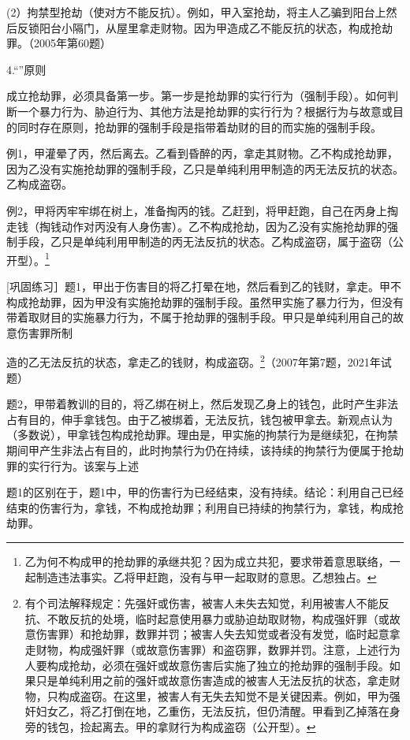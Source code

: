 (2）拘禁型抢劫（使对方不能反抗）。例如，甲入室抢劫，将主人乙骗到阳台上然后反锁阳台小隔门，从屋里拿走财物。因为甲造成乙不能反抗的状态，构成抢劫罪。（2005年第60题）

4.“”原则

成立抢劫罪，必须具备第一步。第一步是抢劫罪的实行行为（强制手段）。如何判断一个暴力行为、胁迫行为、其他方法是抢劫罪的实行行为？根据行为与故意或目的同时存在原则，抢劫罪的强制手段是指带着劫财的目的而实施的强制手段。

例1，甲灌晕了丙，然后离去。乙看到昏醉的丙，拿走其财物。乙不构成抢劫罪，因为乙没有实施抢劫罪的强制手段，乙只是单纯利用甲制造的丙无法反抗的状态。乙构成盗窃。

例2，甲将丙牢牢绑在树上，准备掏丙的钱。乙赶到，将甲赶跑，自己在丙身上掏走钱（掏钱动作对丙没有人身伤害）。乙不构成抢劫，因为乙没有实施抢劫罪的强制手段，乙只是单纯利用甲制造的丙无法反抗的状态。乙构成盗窃，属于盗窃（公开型）。\footnote{乙为何不构成甲的抢劫罪的承继共犯？因为成立共犯，要求带着意思联络，一起制造违法事实。乙将甲赶跑，没有与甲一起取财的意思。乙想独占。}

[巩固练习］题1，甲出于伤害目的将乙打晕在地，然后看到乙的钱财，拿走。甲不构成抢劫罪，因为甲没有实施抢劫罪的强制手段。虽然甲实施了暴力行为，但没有带着取财目的实施暴力行为，不属于抢劫罪的强制手段。甲只是单纯利用自己的故意伤害罪所制

造的乙无法反抗的状态，拿走乙的钱财，构成盗窃。\footnote{有个司法解释规定：先强奸或伤害，被害人未失去知觉，利用被害人不能反抗、不敢反抗的处境，临时起意使用暴力或胁迫劫取财物，构成强奸罪（或故意伤害罪）和抢劫罪，数罪并罚；被害人失去知觉或者没有发觉，临时起意拿走财物，构成强奸罪（或故意伤害罪）和盗窃罪，数罪并罚。注意，上述行为人要构成抢劫，必须在强奸或故意伤害后实施了独立的抢劫罪的强制手段。如果只是单纯利用之前的强奸或故意伤害造成的被害人无法反抗的状态，拿走财物，只构成盗窃。在这里，被害人有无失去知觉不是关键因素。例如，甲为强奸妇女乙，将乙打倒在地，乙重伤，无法反抗，但仍清醒。甲看到乙掉落在身旁的钱包，捡起离去。甲的拿财行为构成盗窃（公开型）。}（2007年第7题，2021年试题）

题2，甲带着教训的目的，将乙绑在树上，然后发现乙身上的钱包，此时产生非法占有目的，伸手拿钱包。由于乙被绑着，无法反抗，钱包被甲拿去。新观点认为（多数说），甲拿钱包构成抢劫罪。理由是，甲实施的拘禁行为是继续犯，在拘禁期间甲产生非法占有目的，此时拘禁行为仍在持续，该持续的拘禁行为便属于抢劫罪的实行行为。该案与上述

题1的区别在于，题1中，甲的伤害行为已经结束，没有持续。结论：利用自己已经结束的伤害行为，拿钱，不构成抢劫罪；利用自已持续的拘禁行为，拿钱，构成抢劫罪。

